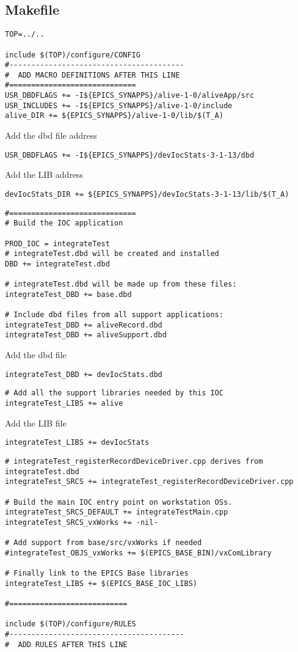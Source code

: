 \documentclass[11pt
  , a4paper
  , article
  , oneside
]{memoir}
\begin{document}
\subsection{Makefile}
\begin{lstlisting}[style=termstyle]
TOP=../..

include $(TOP)/configure/CONFIG
#----------------------------------------
#  ADD MACRO DEFINITIONS AFTER THIS LINE
#=============================
USR_DBDFLAGS += -I${EPICS_SYNAPPS}/alive-1-0/aliveApp/src
USR_INCLUDES += -I${EPICS_SYNAPPS}/alive-1-0/include
alive_DIR += ${EPICS_SYNAPPS}/alive-1-0/lib/$(T_A)
\end{lstlisting}
Add the dbd file address
\begin{lstlisting}[style=termstyle]
USR_DBDFLAGS += -I${EPICS_SYNAPPS}/devIocStats-3-1-13/dbd
\end{lstlisting}
Add the LIB address
\begin{lstlisting}[style=termstyle]
devIocStats_DIR += ${EPICS_SYNAPPS}/devIocStats-3-1-13/lib/$(T_A)
\end{lstlisting}
\begin{lstlisting}[style=termstyle]
#=============================
# Build the IOC application

PROD_IOC = integrateTest
# integrateTest.dbd will be created and installed
DBD += integrateTest.dbd

# integrateTest.dbd will be made up from these files:
integrateTest_DBD += base.dbd

# Include dbd files from all support applications:
integrateTest_DBD += aliveRecord.dbd
integrateTest_DBD += aliveSupport.dbd
\end{lstlisting}
Add the dbd file
\begin{lstlisting}[style=termstyle]
integrateTest_DBD += devIocStats.dbd
\end{lstlisting}
\begin{lstlisting}[style=termstyle]
# Add all the support libraries needed by this IOC
integrateTest_LIBS += alive
\end{lstlisting}
Add the LIB file
\begin{lstlisting}[style=termstyle]
integrateTest_LIBS += devIocStats
\end{lstlisting}
\begin{lstlisting}[style=termstyle]
# integrateTest_registerRecordDeviceDriver.cpp derives from integrateTest.dbd
integrateTest_SRCS += integrateTest_registerRecordDeviceDriver.cpp

# Build the main IOC entry point on workstation OSs.
integrateTest_SRCS_DEFAULT += integrateTestMain.cpp
integrateTest_SRCS_vxWorks += -nil-

# Add support from base/src/vxWorks if needed
#integrateTest_OBJS_vxWorks += $(EPICS_BASE_BIN)/vxComLibrary

# Finally link to the EPICS Base libraries
integrateTest_LIBS += $(EPICS_BASE_IOC_LIBS)

#===========================

include $(TOP)/configure/RULES
#----------------------------------------
#  ADD RULES AFTER THIS LINE
\end{lstlisting}
\end{document}
